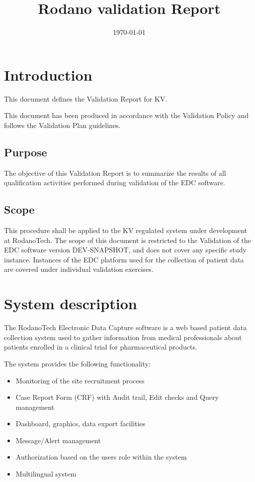 \documentclass[11pt,a4paper,oneside]{article}
\begin{document}
\title{Rodano validation Report}
\newcommand{\documentid}{ValidationReport}
\newcommand{\version}{DEV-SNAPSHOT}
\date{\today}



\clearpage

\tableofcontents

\clearpage

\section{Introduction}
This document defines the Validation Report for KV.

This document has been produced in accordance with the Validation Policy and follows the Validation Plan guidelines.

\subsection{Purpose}
The objective of this Validation Report is to summarize the results of all qualification activities performed during validation of the EDC software.

\subsection{Scope}
This procedure shall be applied to the KV regulated system under development at RodanoTech. The scope of this document is restricted to the Validation of the EDC software version \version, and does not cover any specific study instance. Instances of the EDC platform used for the collection of patient data are covered under individual validation exercises.

\section{System description}
The RodanoTech Electronic Data Capture software is a web based patient data collection system used to gather information from medical professionals about patients enrolled in a clinical trial for pharmaceutical products.

The system provides the following functionality:

\begin{itemize}
	\item Monitoring of the site recruitment process
	\item Case Report Form (CRF) with Audit trail, Edit checks and Query management
	\item Dashboard, graphics, data export facilities
	\item Message/Alert management
	\item Authorization based on the users role within the system
	\item Multilingual system
\end{itemize}
\end{document}
